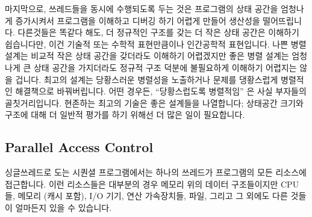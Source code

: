 마지막으로, 쓰레드들을 동시에 수행되도록 두는 것은 프로그램의 상태 공간을
엄청나게 증가시켜서 프로그램을 이해하고 디버깅 하기 어렵게 만들어 생산성을
떨어뜨립니다.
다른것들은 똑같다 해도, 더 정규적인 구조를 갖는 더 작은 상태 공간은 이해하기
쉽습니다만, 이건 기술적 또는 수학적 표현만큼이나 인간공학적 표현입니다.
나쁜 병렬 설계는 비교적 작은 상태 공간을 갖더라도 이해하기 어렵겠지만 좋은 병렬
설계는 엄청나게 큰 상태 공간을 가지더라도 정규적 구조 덕분에 불필요하게
이해하기 어렵지는 않을 겁니다.
최고의 설계는 당황스러운 병렬성을 노출하거나 문제를 댕황스럽게 병렬적인
해결책으로 바꿔버립니다.
어떤 경우든, ``당황스럽도록 병렬적임'' 은 사실 부자들의 골칫거리입니다.
현존하는 최고의 기술은 좋은 설계들을 나열합니다; 상태공간 크기와 구조에 대해 더
일반적 평가를 하기 위해선 더 많은 일이 필요합니다.

\subsection{Parallel Access Control}
\label{sec:Parallel Access Control}

싱글쓰레드로 도는 시퀀셜 프로그램에서는 하나의 쓰레드가 프로그램의 모든
리소스에 접근합니다.
이런 리소스들은 대부분의 경우 메모리 위의 데이터 구조들이지만 CPU들, 메모리
(캐시 포함), I/O 기기, 연산 가속장치들, 파일, 그리고 그 외에도 다른 것들이
얼마든지 있을 수 있습니다.

